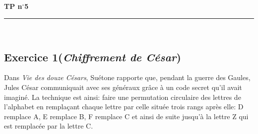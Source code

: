 \documentclass[11pt,a4paper]{article}
\title{}
\date{}
\newcommand{\HRule}{\rule{\linewidth}{0.5mm}}
\begin{document}
\pagestyle{fancy}

\fancyhead{}
 \fancyfoot{}


\newcommand{\lb}{\llbracket}
\newcommand{\rb}{\rrbracket}
\newcommand{\Z}{\mathbb{Z}}

\newcommand{\md}[3]{#1 \equiv #2 \! \! \! \! \! \pmod {#3} }
\newcommand{\nmd}[3]{#1 \not \equiv #2 \! \! \! \! \!  \pmod #3 }
\newcommand{\mda}[3]{#1 \equiv #2 \! \!  \pmod #3 }
\newcommand{\nmda}[3]{#1 \not \equiv #2 \! \! \pmod #3 }
\newcommand{\mo}[2]{#1 \! \! \! \! \! \pmod #2 }

\thispagestyle{fancy}

\begin{center}
    { \huge \bfseries
    TP n$^{\boldsymbol{\circ}}$5
     \\ [0cm] }
    \HRule \\[0.5cm]
\end{center}

\vspace{0.01cm}







\subsection*{Exercice 1(\textit{Chiffrement de César})}

Dans \textit{Vie des douze Césars}, Suétone rapporte que, pendant la guerre des Gaules, Jules César communiquait avec ses généraux grâce à un code secret qu'il avait imaginé. La technique est ainsi: faire une permutation circulaire des lettres de l'alphabet en remplaçant chaque lettre par celle située trois rangs après elle: D remplace A, E remplace B, F remplace C et ainsi de suite jusqu'à la lettre Z qui est remplacée par la lettre C.
\end{document}
